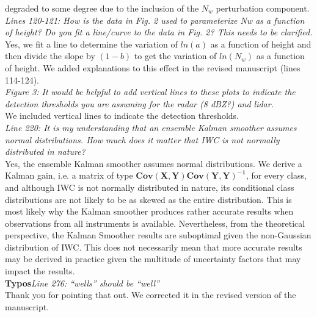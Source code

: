 \documentclass[12pt]{article}
\begin{document}
degraded to some degree due to the inclusion of the $N_w$ perturbation component.\\
\newline
\textit{Lines 120-121: How is the data in Fig. 2 used to parameterize Nw as a function of height? Do you fit a line/curve to the 
data in Fig. 2? This needs to be clarified.}\\
\newline
Yes, we fit a line to determine the variation of $ln(a)$ as a function of height and then divide the slope by $(1-b)$ to get the variation of
$ln(N_w)$ as a function of height. We added explanations to this effect in the revised manuscript (lines 114-124).\\
\newline
\textit{Figure 3: It would be helpful to add vertical lines to these plots to indicate the detection thresholds you are 
assuming for the radar (8 dBZ?) and lidar.}\\
\newline
We included vertical lines to indicate the detection thresholds.\\
\newline
\textit{Line 220: It is my understanding that an ensemble Kalman smoother assumes normal distributions. How much does it matter 
that IWC is not normally distributed in nature?}\\
\newline
Yes, the ensemble Kalman smoother assumes normal distributions.  We derive a Kalman gain, i.e. a matrix of type $\mathbf{Cov(X,Y) Cov(Y,Y)^{-1}}$, 
for every class, and although IWC is not normally distributed in nature, its conditional class distributions are not likely to be as skewed 
as the entire distribution.
This is most likely why the Kalman smoother produces rather accurate results when observations from all instruments is available.  
Nevertheless, from the theoretical perspective, the Kalman Smoother results are suboptimal given the non-Gaussian distribution of IWC.  This
does not necessarily mean that more accurate results may be derived in practice given the multitude of uncertainty factors that may
impact the results.\\
\newline
\textbf{Typos}\textit{Line 276: “wells” should be “well”}\\
\newline
Thank you for pointing that out. We corrected it in the revised version of the manuscript.\\
\newline
\end{document}
